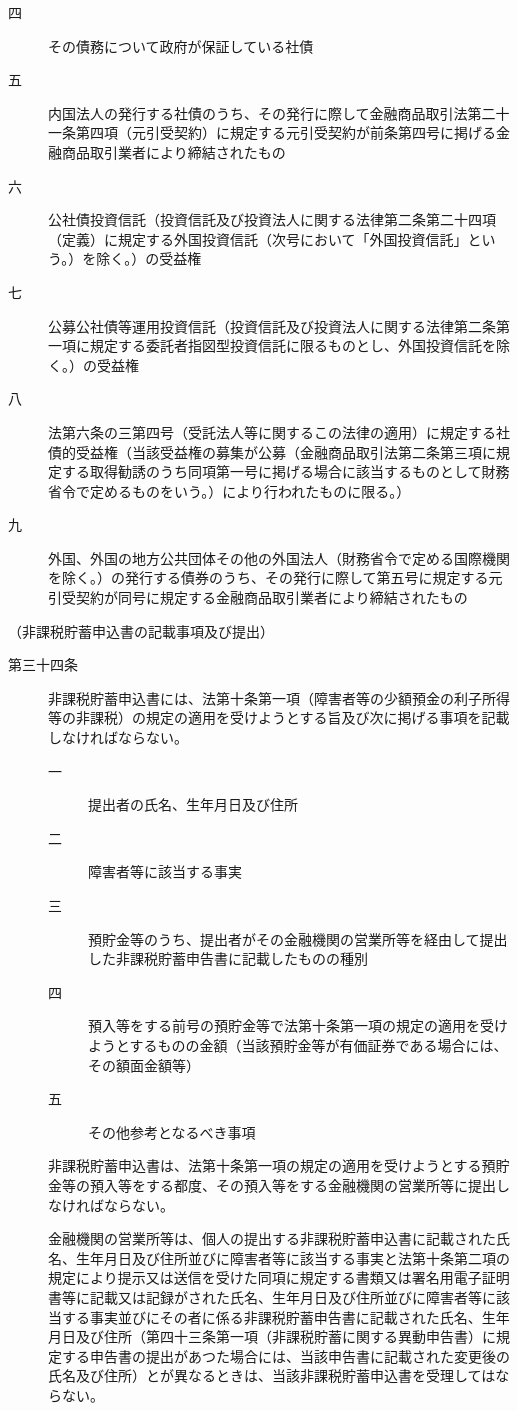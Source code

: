 \documentclass[twocolumn,a4j,10pt]{ltjtarticle}
\begin{document}
\begin{description}
\begin{description}
\item[四]その債務について政府が保証している社債
\item[五]内国法人の発行する社債のうち、その発行に際して金融商品取引法第二十一条第四項（元引受契約）に規定する元引受契約が前条第四号に掲げる金融商品取引業者により締結されたもの
\item[六]公社債投資信託（投資信託及び投資法人に関する法律第二条第二十四項（定義）に規定する外国投資信託（次号において「外国投資信託」という。）を除く。）の受益権
\item[七]公募公社債等運用投資信託（投資信託及び投資法人に関する法律第二条第一項に規定する委託者指図型投資信託に限るものとし、外国投資信託を除く。）の受益権
\item[八]法第六条の三第四号（受託法人等に関するこの法律の適用）に規定する社債的受益権（当該受益権の募集が公募（金融商品取引法第二条第三項に規定する取得勧誘のうち同項第一号に掲げる場合に該当するものとして財務省令で定めるものをいう。）により行われたものに限る。）
\item[九]外国、外国の地方公共団体その他の外国法人（財務省令で定める国際機関を除く。）の発行する債券のうち、その発行に際して第五号に規定する元引受契約が同号に規定する金融商品取引業者により締結されたもの
\end{description}
\end{description}
\noindent\hspace{10pt}（非課税貯蓄申込書の記載事項及び提出）
\begin{description}
\item[第三十四条]非課税貯蓄申込書には、法第十条第一項（障害者等の少額預金の利子所得等の非課税）の規定の適用を受けようとする旨及び次に掲げる事項を記載しなければならない。
\begin{description}
\item[一]提出者の氏名、生年月日及び住所
\item[二]障害者等に該当する事実
\item[三]預貯金等のうち、提出者がその金融機関の営業所等を経由して提出した非課税貯蓄申告書に記載したものの種別
\item[四]預入等をする前号の預貯金等で法第十条第一項の規定の適用を受けようとするものの金額（当該預貯金等が有価証券である場合には、その額面金額等）
\item[五]その他参考となるべき事項
\end{description}
\item[]非課税貯蓄申込書は、法第十条第一項の規定の適用を受けようとする預貯金等の預入等をする都度、その預入等をする金融機関の営業所等に提出しなければならない。
\item[]金融機関の営業所等は、個人の提出する非課税貯蓄申込書に記載された氏名、生年月日及び住所並びに障害者等に該当する事実と法第十条第二項の規定により提示又は送信を受けた同項に規定する書類又は署名用電子証明書等に記載又は記録がされた氏名、生年月日及び住所並びに障害者等に該当する事実並びにその者に係る非課税貯蓄申告書に記載された氏名、生年月日及び住所（第四十三条第一項（非課税貯蓄に関する異動申告書）に規定する申告書の提出があつた場合には、当該申告書に記載された変更後の氏名及び住所）とが異なるときは、当該非課税貯蓄申込書を受理してはならない。
\end{description}
\end{document}
